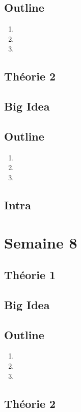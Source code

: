 \documentclass{article}
\begin{document}
\subsection*{Outline}
\begin{enumerate}
    \item
    \item
    \item
\end{enumerate}
\subsection{Théorie 2}
\subsection*{Big Idea}
\subsection*{Outline}
\begin{enumerate}
    \item
    \item
    \item
\end{enumerate}
\subsection{Intra}

\pagebreak
\section{Semaine 8}
\subsection{Théorie 1}
\subsection*{Big Idea}
\subsection*{Outline}
\begin{enumerate}
    \item
    \item
    \item
\end{enumerate}
\subsection{Théorie 2}
\end{document}
